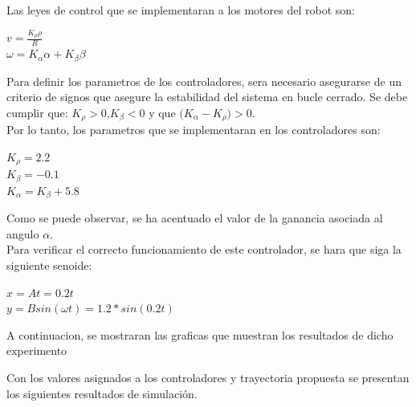 \documentclass[a4paper,twoside]{article}
\begin{document}
Las leyes de control que se implementaran a los motores del robot son:
\begin{center}
$v=\frac{K_{\rho}\rho}{R}$ \\
$\omega=K_{\alpha}\alpha + K_{\beta}\beta$
\end{center}

Para definir los parametros de los controladores, sera necesario asegurarse de un criterio de signos que asegure la estabilidad del sistema en bucle cerrado. Se debe cumplir que: $K_{\rho}>0$,$K_{\beta}<0$ y que $\Big(K_{\alpha}-K_{\rho}\Big)>0$.\\
Por lo tanto, los parametros que se implementaran en los controladores son:
\begin{center}
$K_{\rho}=2.2$\\
$K_{\beta}=-0.1$\\
$K_{\alpha}=K_{\beta}+5.8$
\end{center}
Como se puede observar, se ha acentuado el valor de la ganancia asociada al angulo $\alpha$. \\

Para verificar el correcto funcionamiento de este controlador, se hara que siga la siguiente senoide:
\begin{center}
$x=At=0.2t$\\
$y=Bsin(\omega t)=1.2*sin(0.2t)$
\end{center}

A continuacion, se mostraran las graficas que muestran los resultados de dicho experimento


Con los valores asignados a los controladores y trayectoria propuesta se presentan los siguientes
	resultados de simulación.\\ 
\end{document}
